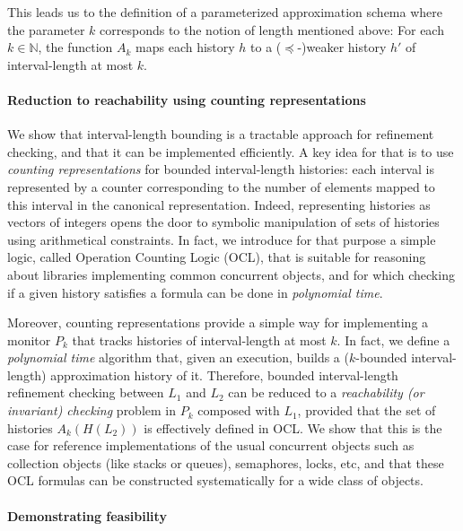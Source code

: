 This leads us to the definition of a parameterized approximation
schema where the parameter $k$ corresponds to the notion of length
mentioned above: For each $k \in \mathbb{N}$, the function $A_k$ maps each
history $h$ to a ($\preceq$-)weaker history $h'$ of interval-length at most $k$. 

\paragraph{Reduction to reachability using counting representations}

We show that interval-length bounding is a tractable approach for
refinement checking, and that it can be implemented efficiently. A key idea for
that is to use \emph{counting representations} for bounded interval-length
histories: each interval is represented by a counter corresponding to the
number of elements mapped to this interval in the canonical representation.
Indeed, representing histories as vectors of integers opens the door
to symbolic manipulation of sets of histories using arithmetical constraints.
In fact, we introduce for that purpose a simple logic, called 
Operation Counting Logic (OCL), that is suitable for reasoning about libraries
implementing common concurrent objects, and for which checking if a given
history satisfies a formula can be done in \emph{polynomial time}.

Moreover, counting representations provide a simple way for implementing a
monitor $P_k$ that tracks histories of interval-length at most $k$. In fact, we define
a \emph{polynomial time} algorithm that, given an execution, builds a
($k$-bounded interval-length) approximation history of it. Therefore, bounded
interval-length refinement checking between $L_1$ and $L_2$ can be reduced to a
\emph{reachability (or invariant) checking} problem in $P_k$ composed with
$L_1$, provided that the set of histories $A_k(H(L_2))$ is effectively defined
in OCL. We show that this is the case for reference implementations of the
usual concurrent objects such as collection objects (like stacks or queues),
semaphores, locks, etc, and that these OCL formulas can be constructed systematically
for a wide class of objects.

\paragraph{Demonstrating feasibility}


